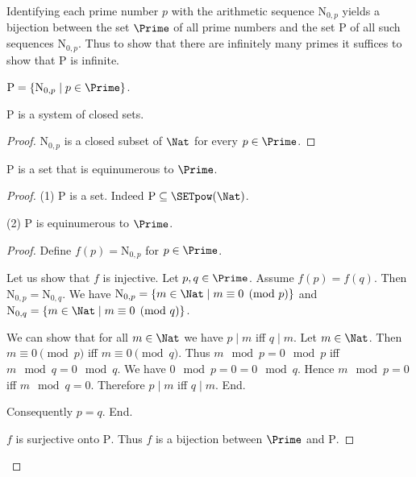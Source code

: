 \documentclass{article}
\newcommand{\N}{\mathrm{N}}
\newcommand{\Ps}{\mathrm{P}}
\begin{document}
  Identifying each prime number $p$ with the arithmetic sequence $\N_{0, p}$
  yields a bijection between the set $\Prime$ of all prime numbers and the set
  $\Ps$ of all such sequences $\N_{0, p}$.
  Thus to show that there are infinitely many primes it suffices to show that
  $\Ps$ is infinite.

  \begin{forthel}
    \begin{definition}
      $\Ps = \{ \N_{0, p} \mid p \in \Prime \}$.
    \end{definition}

    \begin{lemma}
      $\Ps$ is a system of closed sets.
    \end{lemma}
    \begin{proof}
      $\N_{0, p}$ is a closed subset of $\Nat$ for every $p \in \Prime$.
    \end{proof}

    \begin{lemma}
      $\Ps$ is a set that is equinumerous to $\Prime$.
    \end{lemma}
    \begin{proof}
      (1) $\Ps$ is a set.
      Indeed $\Ps \subseteq \SETpow(\Nat)$.

      (2) $\Ps$ is equinumerous to $\Prime$.
      \begin{proof}
        Define $f(p) = \N_{0,p}$ for $p \in \Prime$.

        Let us show that $f$ is injective.
          Let $p, q \in \Prime$.
          Assume $f(p) = f(q)$.
          Then $\N_{0, p} = \N_{0, q}$.
          We have $\N_{0, p} = \{ m \in \Nat \mid m \equiv 0 \pmod{p} \}$ and
          $\N_{0, q} = \{ m \in \Nat \mid m \equiv 0 \pmod{q} \}$.

          We can show that for all $m \in \Nat$ we have $p \mid m$ iff $q \mid m$.
            Let $m \in \Nat$.
            Then $m \equiv 0 \pmod{p}$ iff $m \equiv 0 \pmod{q}$.
            Thus $m \mod p = 0 \mod p$ iff $m \mod q = 0 \mod q$.
            We have $0 \mod p = 0 = 0 \mod q$.
            Hence $m \mod p = 0$ iff $m \mod q = 0$.
            Therefore $p \mid m$ iff $q \mid m$.
          End.

          Consequently $p = q$.
        End.

        $f$ is surjective onto $\Ps$.
        Thus $f$ is a bijection between $\Prime$ and $\Ps$.
      \end{proof}
    \end{proof}


\end{forthel}
\end{document}
